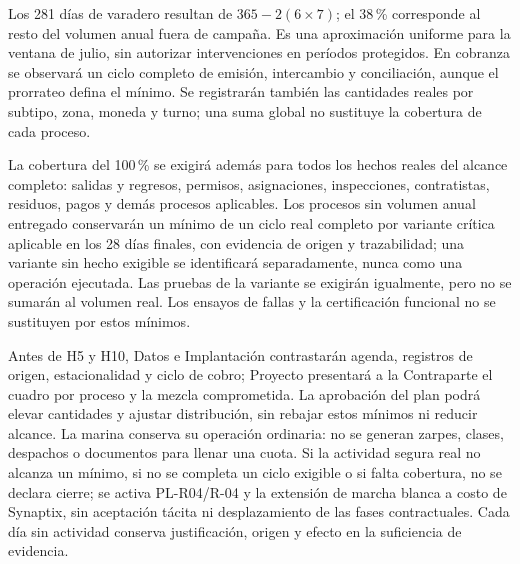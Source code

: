 Los 281 días de varadero resultan de $365-2(6\times7)$; el 38\,\% corresponde al resto del volumen anual fuera de campaña. Es una aproximación uniforme para la ventana de julio, sin autorizar intervenciones en períodos protegidos. En cobranza se observará un ciclo completo de emisión, intercambio y conciliación, aunque el prorrateo defina el mínimo. Se registrarán también las cantidades reales por subtipo, zona, moneda y turno; una suma global no sustituye la cobertura de cada proceso.

La cobertura del 100\,\% se exigirá además para todos los hechos reales del alcance completo: salidas y regresos, permisos, asignaciones, inspecciones, contratistas, residuos, pagos y demás procesos aplicables. Los procesos sin volumen anual entregado conservarán un mínimo de un ciclo real completo por variante crítica aplicable en los 28 días finales, con evidencia de origen y trazabilidad; una variante sin hecho exigible se identificará separadamente, nunca como una operación ejecutada. Las pruebas de la variante se exigirán igualmente, pero no se sumarán al volumen real. Los ensayos de fallas y la certificación funcional no se sustituyen por estos mínimos.

Antes de H5 y H10, Datos e Implantación contrastarán agenda, registros de origen, estacionalidad y ciclo de cobro; Proyecto presentará a la Contraparte el cuadro por proceso y la mezcla comprometida. La aprobación del plan podrá elevar cantidades y ajustar distribución, sin rebajar estos mínimos ni reducir alcance. La marina conserva su operación ordinaria: no se generan zarpes, clases, despachos o documentos para llenar una cuota. Si la actividad segura real no alcanza un mínimo, si no se completa un ciclo exigible o si falta cobertura, no se declara cierre; se activa PL-R04/R-04 y la extensión de marcha blanca a costo de Synaptix, sin aceptación tácita ni desplazamiento de las fases contractuales. Cada día sin actividad conserva justificación, origen y efecto en la suficiencia de evidencia.\parencite[arts.~17.3 y 18, p.~13]{bases-admin}
